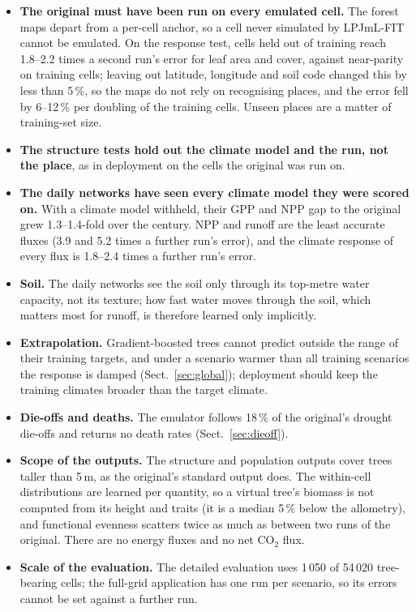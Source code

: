 \documentclass[11pt,a4paper]{article}
\begin{document}
\begin{itemize}
  \item \textbf{The original must have been run on every emulated cell.} The forest maps depart from a per-cell anchor,
        so a cell never simulated by LPJmL-FIT cannot be emulated. On the response test, cells held out of training
        reach 1.8--2.2 times a second run's error for leaf area and cover, against near-parity on training cells; leaving
        out latitude, longitude and soil code changed this by less than 5\,\%, so the maps do not rely on recognising
        places, and the error fell by 6--12\,\% per doubling of the training cells. Unseen places are a matter of
        training-set size.
  \item \textbf{The structure tests hold out the climate model and the run, not the place}, as in deployment on the
        cells the original was run on.
  \item \textbf{The daily networks have seen every climate model they were scored on.} With a climate model withheld,
        their GPP and NPP gap to the original grew 1.3--1.4-fold over the century. NPP and runoff are the least
        accurate fluxes (3.9 and 5.2 times a further run's error), and the climate response of every flux is 1.8--2.4
        times a further run's error.
  \item \textbf{Soil.} The daily networks see the soil only through its top-metre water capacity, not its texture; how
        fast water moves through the soil, which matters most for runoff, is therefore learned only implicitly.
  \item \textbf{Extrapolation.} Gradient-boosted trees cannot predict outside the range of their training targets, and
        under a scenario warmer than all training scenarios the response is damped (Sect.~\ref{sec:global});
        deployment should keep the training climates broader than the target climate.
  \item \textbf{Die-offs and deaths.} The emulator follows 18\,\% of the original's drought die-offs and returns no
        death rates (Sect.~\ref{sec:dieoff}).
  \item \textbf{Scope of the outputs.} The structure and population outputs cover trees taller than 5\,m, as the
        original's standard output does. The within-cell distributions are learned per quantity, so a virtual tree's
        biomass is not computed from its height and traits (it is a median 5\,\% below the allometry), and
        functional evenness scatters twice as much as between two runs of the original. There are no energy fluxes and
        no net CO$_2$ flux.
  \item \textbf{Scale of the evaluation.} The detailed evaluation uses 1\,050 of 54\,020 tree-bearing cells; the
        full-grid application has one run per scenario, so its errors cannot be set against a further run.
\end{itemize}
\end{document}
